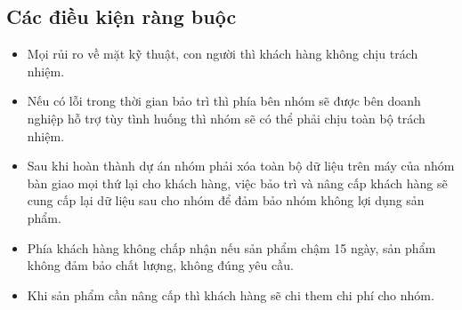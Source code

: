 \documentclass[12pt]{article}
\begin{document}
\subsection{Các điều kiện ràng buộc}
\begin{itemize}[label=-, leftmargin=1cm]
\item Mọi rủi ro về mặt kỹ thuật, con người thì khách hàng không chịu trách nhiệm.
\item Nếu có lỗi trong thời gian bảo trì thì phía bên nhóm sẽ được bên doanh nghiệp hỗ trợ tùy tình huống thì nhóm sẽ có thể phải chịu toàn bộ trách nhiệm.
\item Sau khi hoàn thành dự án nhóm phải xóa toàn bộ dữ liệu trên máy của nhóm bàn giao mọi thứ lại cho khách hàng, việc bảo trì và nâng cấp khách hàng sẽ cung cấp lại dữ liệu sau cho nhóm để đảm bảo nhóm không lợi dụng sản phẩm.
\item Phía khách hàng không chấp nhận nếu sản phẩm chậm 15 ngày, sản phẩm không đảm bảo chất lượng, không đúng yêu cầu.
\item Khi sản phẩm cần nâng cấp thì khách hàng sẽ chi them chi phí cho nhóm.
\end{itemize}
\newpage
\end{document}
